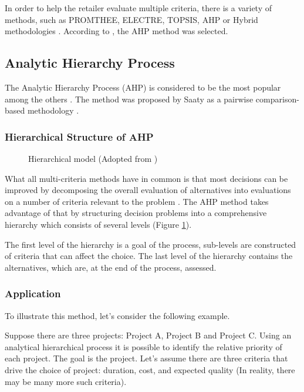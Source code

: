 In order to help the retailer evaluate multiple criteria, there is a variety of methods, such as PROMTHEE, ELECTRE, TOPSIS, AHP or Hybrid methodologies \cite{yap2019systematic}. According to \cite{roig2013retail}, the AHP method was selected.

\subsection{Analytic Hierarchy Process}
\label{subsec:ahp}

The Analytic Hierarchy Process (AHP) is considered to be the most popular among the others \cite{taherdoost2023comprehensive}. The method was proposed by Saaty as a pairwise comparison-based methodology \cite{saaty1988analytic}. 

\subsubsection{Hierarchical Structure of AHP}

\begin{figure}[ht]
	\centering
	
	\caption{Hierarchical model (Adopted from \cite{roig2013retail})}
	\label{fig:ahp-structure}
\end{figure}

What all multi-criteria methods have in common is that most decisions can be improved by decomposing the overall evaluation of alternatives into evaluations on a number of criteria relevant to the problem \cite{durbach2012modeling}. The AHP method takes advantage of that by structuring decision problems into a comprehensive hierarchy which consists of several levels \cite{taherdoost2023comprehensive} (Figure \ref{fig:ahp-structure}).

The first level of the hierarchy is a goal of the process, sub-levels are constructed of criteria that can affect the choice. The last level of the hierarchy contains the alternatives, which are, at the end of the process, assessed.

\subsubsection{Application}

To illustrate this method, let's consider the following example. 

Suppose there are three projects: Project A, Project B and Project C. Using an analytical hierarchical process it is possible to identify the relative priority of each project. The goal is the project. Let's assume there are three criteria that drive the choice of project: duration, cost, and expected quality (In reality, there may be many more such criteria).

